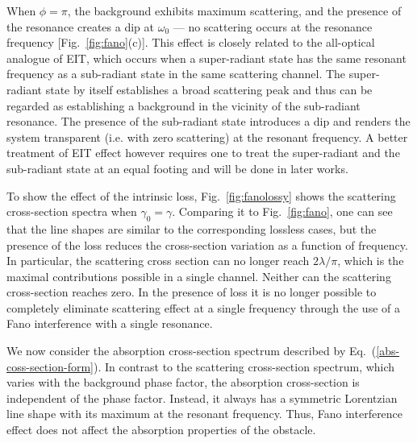 \documentclass[preprint,aps]{revtex4}
\begin{document}
When $\phi = \pi$, the background exhibits maximum scattering, and
the presence of the resonance creates a  dip at $\omega_0$
--- no scattering occurs at the resonance frequency
[Fig.~\ref{fig:fano}(c)]. This effect is closely related to the
all-optical analogue of EIT, which occurs when a super-radiant state
has the same resonant frequency as a sub-radiant state in the same
scattering channel. The super-radiant state by itself establishes a
broad scattering peak and thus can be regarded as establishing a
background in the vicinity of the sub-radiant resonance. The
presence of the sub-radiant state introduces a dip and renders the
system transparent (i.e. with zero scattering) at the resonant
frequency.  A better treatment of EIT effect however requires one to
treat the super-radiant and the sub-radiant state at an equal
footing \cite{Suh2004temporal} and will be done in later works.



To show the effect of the intrinsic loss, Fig.~\ref{fig:fanolossy}
shows the scattering cross-section spectra when $\gamma_0=\gamma$.
Comparing it to Fig.~\ref{fig:fano}, one can see that the line
shapes are similar to the corresponding lossless cases, but the
presence of the loss reduces the cross-section variation as a
function of frequency. In particular, the scattering cross section
can no longer reach $2 \lambda / \pi$, which is the maximal
contributions possible in a single channel. Neither can the
scattering cross-section reaches zero. In the presence of loss it is
no longer possible to completely eliminate scattering effect at a
single frequency through the use of a Fano interference with a
single resonance.

We now consider the absorption cross-section spectrum described by
Eq.~(\ref{abs-coss-section-form}). In contrast to the scattering
cross-section spectrum, which varies with the background phase
factor, the absorption cross-section is independent of the phase
factor. Instead, it always has a symmetric Lorentzian line shape
with its maximum at the resonant frequency.  Thus, Fano interference
effect does not affect the absorption properties of  the obstacle.
\end{document}
